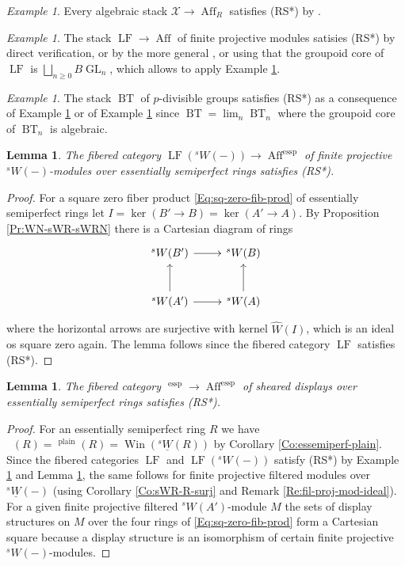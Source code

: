 \documentclass[a4paper,11pt]{amsart}
\theoremstyle{plain}
\newtheorem{Lemma}[equation]{Lemma}
\theoremstyle{definition}
\theoremstyle{remark}
\newtheorem{Example}[equation]{Example}
\newcommand{\bLe}{\begin{Lemma}}
\newcommand{\eLe}{\end{Lemma}}
\newcommand{\bEx}{\begin{Example}}
\newcommand{\eEx}{\end{Example}}
\newcommand{\bproof}{\begin{proof}}
\newcommand{\eproof}{\end{proof}}
\renewcommand{\u}{\underline}
\numberwithin{equation}{section}
\newcommand{\XXX}{\mathcal{X}}
\DeclareMathOperator{\essemiperf}{essp}
\DeclareMathOperator{\plain}{plain}
\DeclareMathOperator{\Aff}{Aff}
\DeclareMathOperator{\BT}{BT}
\DeclareMathOperator{\sDisp}{{}^sDisp}
\DeclareMathOperator{\GL}{GL}
\DeclareMathOperator{\LF}{LF}
\DeclareMathOperator{\Win}{Win}
\newcommand{\sW}{{}^sW}
\newcommand{\usW}{{}^s\u W}
\newcommand{\cclearpage}{}%
\begin{document}
\bEx
\label{Ex:RS*-algebraic}
Every algebraic stack $\XXX\to\Aff_R$ satisfies (RS*) by \cite[\href{https://stacks.math.columbia.edu/tag/0CXP}{Lemma 0CXP}]{Stacks}. 
\eEx

\bEx
\label{Ex:RS*-LF}
The stack $\LF\to\Aff$ of finite projective modules satisies (RS*) by direct verification, or by the more general \cite[Theorem 2.2]{Milnor:Algebraic-K-Theory}, or using that the groupoid core of $\LF$ is $\bigsqcup_{n\ge 0}B{\GL_n}$, which allows to apply Example \ref{Ex:RS*-algebraic}.
\eEx

\bEx
\label{Ex:RS*-BT}
The stack $\BT$ of $p$-divisible groups satisfies (RS*) as a consequence of Example \ref{Ex:RS*-LF} or of Example \ref{Ex:RS*-algebraic} since $\BT=\lim_n\BT_n$ where the groupoid core of $\BT_n$ is algebraic.
\eEx

\bLe
\label{Le:RS*-LFsW}
The fibered category $\LF(\sW(-))\to\Aff^{\essemiperf}$ of finite projective $\sW(-)$-modules over essentially semiperfect rings satisfies (RS*). 
\eLe

\bproof
For a square zero fiber product \eqref{Eq:sq-zero-fib-prod} of essentially semiperfect rings let $I=\ker(B'\to B)=\ker(A'\to A)$. By Proposition \ref{Pr:WN-sWR-sWRN} there is a Cartesian diagram of rings
\[
\xymatrix@M+0.2em{
\sW(B') \ar[r] & \sW(B) \\
\sW(A') \ar[r] \ar[u] & \sW(A) \ar[u]
}
\]
where the horizontal arrows are surjective with kernel $\hat W(I)$, which is an ideal os square zero again. The lemma follows since the fibered category $\LF$ satisfies (RS*).
\eproof

\bLe
\label{Le:RS*-sDisp}
The fibered category $\sDisp^{\essemiperf}\to\Aff^{\essemiperf}$ of sheared displays over essentially semiperfect rings satisfies (RS*).
\eLe

\bproof
For an essentially semiperfect ring $R$ we have $\sDisp(R)=\sDisp^{\plain}(R)=\Win(\usW(R))$ by Corollary \ref{Co:essemiperf-plain}. Since the fibered categories $\LF$ and $\LF(\sW(-))$ satisfy (RS*) by Example \ref{Ex:RS*-LF} and Lemma \ref{Le:RS*-LFsW}, the same follows for finite projective filtered modules over $\usW(-)$ (using Corollary \ref{Co:sWR-R-surj} and Remark \ref{Re:fil-proj-mod-ideal}).
For a given finite projective filtered $\sW(A')$-module $M$ the sets of display structures on $M$ over the four rings of \eqref{Eq:sq-zero-fib-prod} form a Cartesian square because a display structure is an isomorphism of certain finite projective $\sW(-)$-modules.
\eproof


\cclearpage
\end{document}
